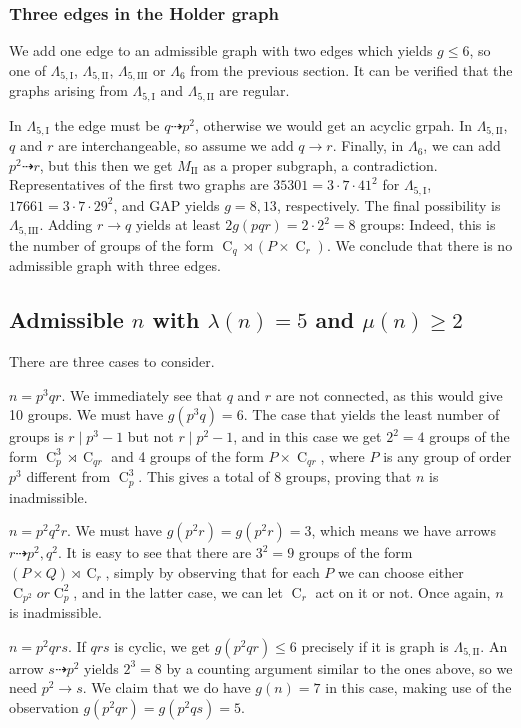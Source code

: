 \documentclass[draft]{article}
\newcommand{\cyc}[1]{\operatorname{C}_{#1}}
\newcommand{\qlame}{\Lambda_{5,\text{I}}}
\newcommand{\qlamz}{\Lambda_{5,\text{II}}}
\newcommand{\qlamd}{\Lambda_{5,\text{III}}}
\theoremstyle{plain}
\theoremstyle{definition}
\begin{document}
\subsubsection*{Three edges in the Holder graph}
We add one edge to an admissible graph with two edges which yields $g \le 6$, so one of $\qlame$, $\qlamz$, $\qlamd$ or $\Lambda_{6}$ from the previous section. It can be verified that the graphs arising from $\qlame$ and $\qlamz$ are regular.

In $\qlame$ the edge must be $q \dashrightarrow p^2$, otherwise we would get an acyclic grpah. In $\qlamz$, $q$ and $r$ are interchangeable, so assume we add $q \rightarrow r$. Finally, in $\Lambda_6$, we can add $p^2 \dashrightarrow r$, but this then we get $M_\text{II}$ as a proper subgraph, a contradiction. Representatives of the first two graphs are $35301 = 3\cdot7\cdot41^2$ for $\qlame$, $17661 = 3\cdot7\cdot29^2$, and GAP yields $g = 8, 13$, respectively. The final possibility is $\qlamd$. 
Adding $r \rightarrow q$ yields at least $2g(pqr) = 2 \cdot 2^2 = 8$ groups: Indeed, this is the number of groups of the form $\cyc{q} \rtimes (P \times \cyc{r})$. We conclude that there is no admissible graph with three edges.


\subsection{Admissible $n$ with $\lambda(n) = 5$ and $\mu(n) \ge 2$} 
There are three cases to consider.

 $n = p^3 q r$. We immediately see that $q$ and $r$ are not connected, as this would give 10 groups. We must have $g(p^3 q) = 6$. The case that yields the least number of groups is $r \mid p^3 - 1$ but not $r \mid p^2 - 1$, and in this case we get $2^2 = 4$ groups of the form $\cyc{p}^3 \rtimes \cyc{qr}$ and 4 groups of the form $P \times \cyc{qr}$, where $P$ is any group of order $p^3$ different from $\cyc{p}^3$. This gives a total of 8 groups, proving that $n$ is inadmissible.

 $n = p^2 q^2 r$. We must have $g(p^2 r) = g(p^2 r) = 3$, which means we have arrows $r \dashrightarrow p^2, q^2$. It is easy to see that there are $3^2 = 9$ groups of the form $(P \times Q) \rtimes \cyc{r}$, simply by observing that for each $P$ we can choose either $\cyc{p^2} or \cyc{p}^2$, and in the latter case, we can let $\cyc{r}$ act on it or not. Once again, $n$ is inadmissible.
 
 $n = p^2 q r s$.
If $qrs$ is cyclic, we get $g(p^2 q r) \le 6$ precisely if it is graph is $\qlamz$. An arrow $s \dashrightarrow p^2$ yields $2^3 = 8$ by a counting argument similar to the ones above, so we need $p^2 \rightarrow s$. We claim that we do have $g(n) = 7$ in this case, making use of the observation $g(p^2 q r) = g(p^2 q s) = 5$.
\end{document}
